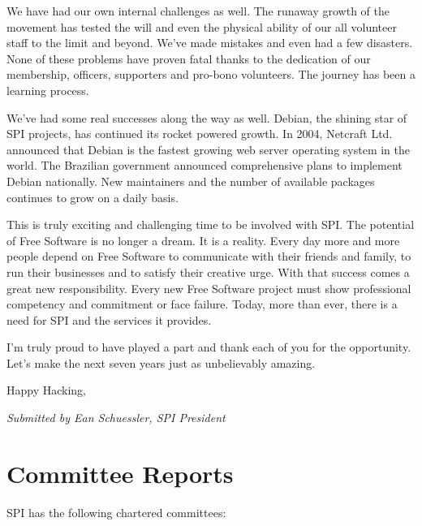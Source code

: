\documentclass[letterpaper]{report}
\begin{document}
We have had our own internal challenges as well. The runaway growth
of the movement has tested the will and even the physical ability
of our all volunteer staff to the limit and beyond. We've made mistakes
and even had a few disasters. None of these problems have proven fatal
thanks to the dedication of our membership, officers, supporters and
pro-bono volunteers. The journey has been a learning process.

We've had some real successes along the way as well. Debian, the shining
star of SPI projects, has continued its rocket powered growth. In
2004, Netcraft Ltd. announced that Debian is the fastest growing web
server operating system in the world. The Brazilian government announced
comprehensive plans to implement Debian nationally. New maintainers
and the number of available packages continues to grow on a daily
basis.

This is truly exciting and challenging time to be involved with SPI.
The potential of Free Software is no longer a dream. It is a reality.
Every day more and more people depend on Free Software to communicate
with their friends and family, to run their businesses and to satisfy
their creative urge. With that success comes a great new responsibility.
Every new Free Software project must show professional competency
and commitment or face failure. Today, more than ever, there is a
need for SPI and the services it provides.

I'm truly proud to have played a part and thank each of you for the
opportunity. Let's make the next seven years just as unbelievably
amazing.

Happy Hacking,

\emph{Submitted by Ean Schuessler, SPI President}


\chapter{Committee Reports}

SPI has the following chartered committees:
\end{document}
